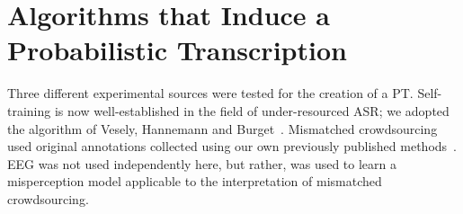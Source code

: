 \section{Algorithms that Induce a Probabilistic Transcription}

Three different experimental sources were tested for the creation of a
PT.  Self-training is now well-established in the field of
under-resourced ASR; we adopted the algorithm of Vesely, Hannemann and
Burget~\cite{vesely2013-semi}.  Mismatched crowdsourcing used original
annotations collected using our own previously published
methods~\cite{JHJ15b}.  EEG was not used independently here, but
rather, was used to learn a misperception model applicable to the
interpretation of mismatched crowdsourcing.
